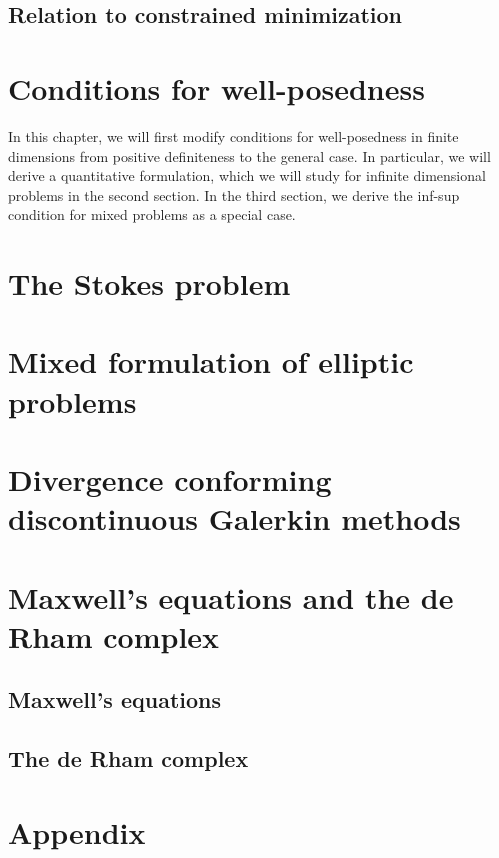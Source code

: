 \section{Relation to constrained minimization}


\chapter{Conditions for well-posedness}
\label{sec:mixed-wellposedness}
In this chapter, we will first modify conditions for well-posedness in
finite dimensions from positive definiteness to the general case. In
particular, we will derive a quantitative formulation, which we will
study for infinite dimensional problems in the second section. In the
third section, we derive the inf-sup condition for mixed problems as a
special case.


\chapter{The Stokes problem}
\label{cha:stokes}


\chapter{Mixed formulation of elliptic problems}
\label{cha:darcy}


\chapter{Divergence conforming discontinuous Galerkin methods}
\label{cha:hdivdg}


\chapter{Maxwell's equations and the de Rham complex}
\section{Maxwell's equations}
\label{cha:maxwell}


\section{The de Rham complex}
\label{cha:derham}


\appendix
\chapter{Appendix}

